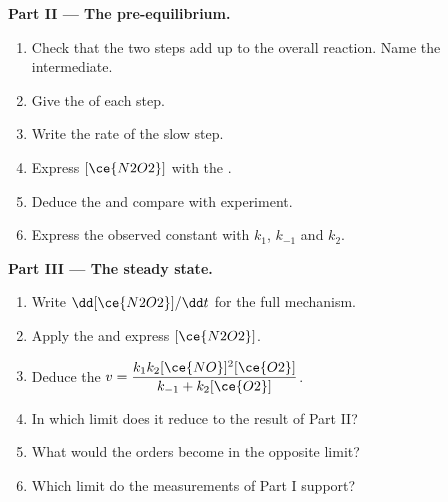 \begin{problem}
\medskip
\noindent\textbf{Part II --- The pre-equilibrium.}
\begin{enumerate}[resume]
  \item Check that the two steps add up to the overall reaction. Name the
        intermediate.
  \item Give the  of each step.
  \item Write the rate of the slow step.
  \item Express $[\ce{N2O2}]$ with the .
  \item Deduce the  and compare with experiment.
  \item Express the observed constant with $k_1$, $k_{-1}$ and $k_2$.
\end{enumerate}

\medskip
\noindent\textbf{Part III --- The steady state.}
\begin{enumerate}[resume]
  \item Write $\dd[\ce{N2O2}]/\dd t$ for the full mechanism.
  \item Apply the  and express $[\ce{N2O2}]$.
  \item Deduce the  $v = \dfrac{k_1k_2[\ce{NO}]^2[\ce{O2}]}{k_{-1} +
        k_2[\ce{O2}]}$.
  \item In which limit does it reduce to the result of Part II?
  \item What would the orders become in the opposite limit?
  \item Which limit do the measurements of Part I support?
\end{enumerate}


\end{problem}
